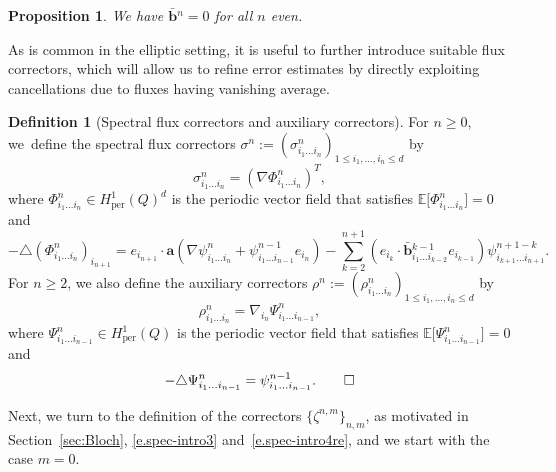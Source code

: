 \documentclass[10pt]{amsart}
\theoremstyle{plain}
\newtheorem{prop0}[theor0]{Proposition}
\newenvironment{prop}
{\renewcommand{\qedsymbol}{$\lozenge$}\pushQED{\qed}\begin{prop0}}
{\popQED\end{prop0}}
\theoremstyle{definition}
\newtheorem{defin0}[theor0]{Definition}
\newenvironment{defin}
{\renewcommand{\qedsymbol}{$\lozenge$}\pushQED{\qed}\begin{defin0}}
{\popQED\end{defin0}}
\numberwithin{equation}{section}
\newcommand{\per}{{\operatorname{per}}}
\newcommand{\ee}{e}
\newcommand{\Aa}{\boldsymbol a}
\newcommand{\bb}{{\boldsymbol b}}
\newcommand{\expecm}[1]{\mathbb{E}\bigl[ #1 \bigr]}\let\bexpec\expecm
\begin{document}
\begin{prop}\label{prop:vanish}
We have $\bar\bb{}^{n}=0$ for all $n$ even.
\end{prop}

As is common in the elliptic setting, it is useful to further introduce suitable flux correctors, which will allow us to refine error estimates by directly exploiting cancellations due to fluxes having vanishing average.

\begin{defin}[Spectral flux correctors and auxiliary correctors]\label{def:spec-fluc-corr-psi}
For $n\ge0$, we~define the spectral flux correctors $\sigma^n:=(\sigma^n_{i_1\ldots i_n})_{1\le i_1,\ldots,i_n\le d}$ by
\[\sigma_{i_1\ldots i_n}^n=(\nabla\Phi_{i_1\ldots i_n}^n)^T,\]
where $\Phi^n_{i_1\ldots i_n}\in H^1_\per(Q)^d$ is the periodic vector field that satisfies $\expecm{\Phi_{i_1\ldots i_n}^n}=0$ and
\[-\triangle (\Phi_{i_1\ldots i_n}^n)_{i_{n+1}}=e_{i_{n+1}}\cdot \Aa(\nabla\psi^{n}_{i_1\ldots i_{n}}+\psi^{n-1}_{i_1\ldots i_{n-1}}\ee_{i_n})
-\sum_{k=2}^{n+1}(\ee_{i_{k}}\cdot\bar\bb{}^{k-1}_{i_1\ldots i_{k-2}}\ee_{i_{k-1}})\psi^{n+1-k}_{i_{k+1}\ldots i_{n+1}}.
\]
For $n\ge2$, we also define the auxiliary correctors $\rho^n:=(\rho^n_{i_1\ldots i_n})_{1\le i_1,\ldots,i_n\le d}$ by
\[\rho^n_{i_1\ldots i_n}=\nabla_{i_n}\Psi^n_{i_1\ldots i_{n-1}},\]
where $\Psi^n_{i_1\ldots i_{n-1}}\in H^1_\per(Q)$ is the periodic vector field that satisfies $\expecm{\Psi^n_{i_1\ldots i_{n-1}}}=0$ and
\begin{equation*}
-\triangle\Psi^{n}_{i_1\ldots i_{n-1}}=\psi^{n-1}_{i_1\ldots i_{n-1}}.\qedhere
\end{equation*}
\end{defin}

Next, we turn to the definition of the correctors $\{\zeta^{n,m}\}_{n,m}$, as motivated in Section~\ref{sec:Bloch}, \cf \eqref{e.spec-intro3} and~\eqref{e.spec-intro4re}, and we start with the case $m=0$.
\end{document}
